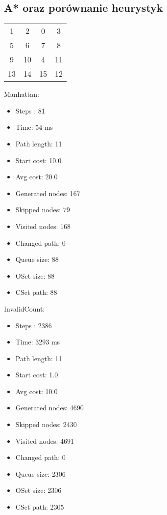 \documentclass{classrep}
\begin{document}
			\subsection{A* oraz porównanie heurystyk}
				\begin{center}
					\begin{tabular}{ c c c c }
	  						1 & 2 & 0 & 3 \\
	  						5 & 6 & 7 & 8 \\
	  						9 & 10 & 4 & 11 \\
	  						13 & 14 & 15 & 12 \\
					\end{tabular}
				\end{center}
					Manhattan:
					\begin{itemize}
						\item Steps :					81
						\item Time:					54 ms
						\item Path length:			11
						\item Start cost:				10.0
						\item Avg cost:				20.0
						\item Generated nodes:		167
						\item Skipped nodes:			79
						\item Visited nodes:			168
						\item Changed path:			0
						\item Queue size:				88
						\item OSet size:				88
						\item CSet path:				88
					\end{itemize}
					InvalidCount:
					\begin{itemize}
						\item Steps :					2386
						\item Time:					3293 ms
						\item Path length:			11
						\item Start cost:				1.0
						\item Avg cost:				10.0
						\item Generated nodes:		4690
						\item Skipped nodes:			2430
						\item Visited nodes:			4691
						\item Changed path:			0
						\item Queue size:				2306
						\item OSet size:				2306
						\item CSet path:				2305
					\end{itemize}
			
\end{document}
